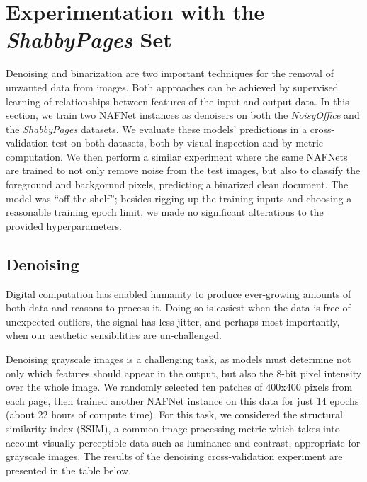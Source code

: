 \documentclass[runningheads]{llncs}
\begin{document}
\section{Experimentation with the \emph{ShabbyPages} Set}
Denoising and binarization are two important techniques for the removal of unwanted data from images.
Both approaches can be achieved by supervised learning of relationships between features of the input and output data.
In this section, we train two NAFNet \cite{ref_nafnet} instances as denoisers on both the \emph{NoisyOffice} and the \emph{ShabbyPages} datasets. We evaluate these models' predictions in a cross-validation test on both datasets, both by visual inspection and by metric computation.
We then perform a similar experiment where the same NAFNets are trained to not only remove noise from the test images, but also to classify the foreground and backgorund pixels, predicting a binarized clean document.
The model was ``off-the-shelf''; besides rigging up the training inputs and choosing a reasonable training epoch limit, we made no significant alterations to the provided hyperparameters.

\subsection{Denoising}
Digital computation has enabled humanity to produce ever-growing amounts of both data and reasons to process it.
Doing so is easiest when the data is free of unexpected outliers, the signal has less jitter, and perhaps most importantly, when our aesthetic sensibilities are un-challenged.

Denoising grayscale images is a challenging task, as models must determine not only which features should appear in the output, but also the 8-bit pixel intensity over the whole image.
We randomly selected ten patches of 400x400 pixels from each page, then trained another NAFNet instance on this data for just 14 epochs (about 22 hours of compute time).
For this task, we considered the structural similarity index (SSIM), a common image processing metric which takes into account visually-perceptible data such as luminance and contrast, appropriate for grayscale images.
The results of the denoising cross-validation experiment are presented in the table below.

\begin{table}[]
    \centering
    \caption{Document image denoising cross-test performance of NAFNet models trained on \emph{ShabbyPages} and \emph{NoisyOffice}.} \label{tab:denoising_results}
\end{table}
\end{document}
